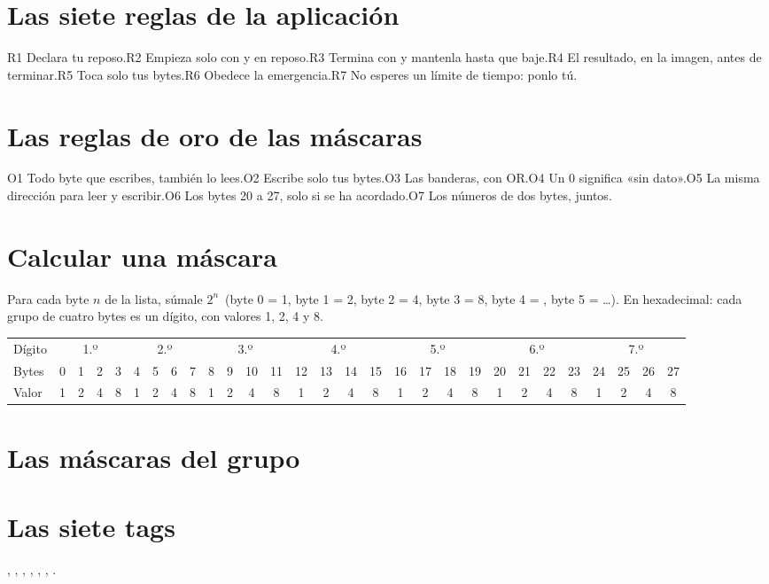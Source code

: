 \section*{Las siete reglas de la aplicación}
R1 Declara tu reposo.\quad R2 Empieza solo con  y en reposo.\quad R3 Termina con  y mantenla hasta que  baje.\quad R4 El resultado, en la imagen, antes de terminar.\quad R5 Toca solo tus bytes.\quad R6 Obedece la emergencia.\quad R7 No esperes un límite de tiempo: ponlo tú.

\section*{Las reglas de oro de las máscaras}
O1 Todo byte que escribes, también lo lees.\quad O2 Escribe solo tus bytes.\quad O3 Las banderas, con OR.\quad O4 Un 0 significa «sin dato».\quad O5 La misma dirección para leer y escribir.\quad O6 Los bytes 20 a 27, solo si se ha acordado.\quad O7 Los números de dos bytes, juntos.

\section*{Calcular una máscara}
Para cada byte $n$ de la lista, súmale $2^{n}$ \,(byte 0 = 1, byte 1 = 2, byte 2 = 4, byte 3 = 8, byte 4 = , byte 5 = \dots). En hexadecimal: cada grupo de cuatro bytes es un dígito, con valores 1, 2, 4 y 8.

\begin{center}
\footnotesize\setlength{\tabcolsep}{2.0pt}
\begin{tabular}{l|cccc|cccc|cccc|cccc|cccc|cccc|cccc}
Dígito & \multicolumn{4}{c|}{1.º} & \multicolumn{4}{c|}{2.º} & \multicolumn{4}{c|}{3.º} & \multicolumn{4}{c|}{4.º} & \multicolumn{4}{c|}{5.º} & \multicolumn{4}{c|}{6.º} & \multicolumn{4}{c}{7.º} \\
Bytes & 0&1&2&3 & 4&5&6&7 & 8&9&10&11 & 12&13&14&15 & 16&17&18&19 & 20&21&22&23 & 24&25&26&27 \\
Valor & 1&2&4&8 & 1&2&4&8 & 1&2&4&8 & 1&2&4&8 & 1&2&4&8 & 1&2&4&8 & 1&2&4&8 \\
\end{tabular}
\end{center}

\section*{Las máscaras del grupo}


\section*{Las siete tags}
 ,  ,  ,  ,  ,  ,  .
